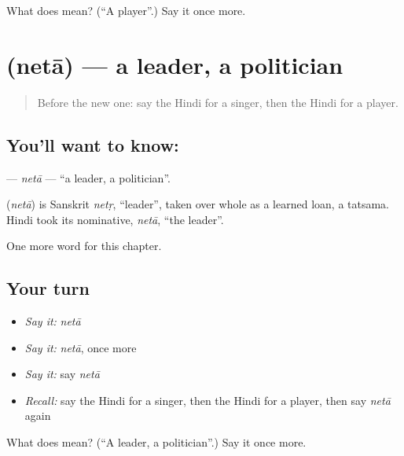 \begin{tcolorbox}[breakable,colback=teal!4,colframe=teal!35!black,title={Before you move on}]
What does  mean? (\textquotedblleft{}A player\textquotedblright{}.) Say it once more.
\end{tcolorbox}
\section[\texorpdfstring{\hi{नेता} (netā)}{नेता (netā)}]{ (netā) — a leader, a politician}

\label{lesson:HI-C195-neta}



\begin{quote}
Before the new one: say the Hindi for a singer, then the Hindi for a player.
\end{quote}

\subsection*{You'll want to know: }
\textbf{} — \emph{netā} — \textquotedblleft{}a leader, a politician\textquotedblright{}.

\begin{cousinweb}
\textbf{} (\emph{netā}) is Sanskrit \emph{netṛ}, \textquotedblleft{}leader\textquotedblright{}, taken over whole as a learned loan, a tatsama. Hindi took its nominative, \emph{netā}, \textquotedblleft{}the leader\textquotedblright{}.
\end{cousinweb}

\begin{grammarlens}[title={What you've built}]
One more word for this chapter.
\end{grammarlens}

\subsection*{Your turn}
\begin{itemize}
\raggedright
  \item \emph{Say it:} \emph{netā}
  \item \emph{Say it:} \emph{netā}, once more
  \item \emph{Say it:} say \emph{netā}
  \item \emph{Recall:} say the Hindi for a singer, then the Hindi for a player, then say \emph{netā} again
\end{itemize}

\begin{tcolorbox}[breakable,colback=teal!4,colframe=teal!35!black,title={Before you move on}]
What does  mean? (\textquotedblleft{}A leader, a politician\textquotedblright{}.) Say it once more.
\end{tcolorbox}

